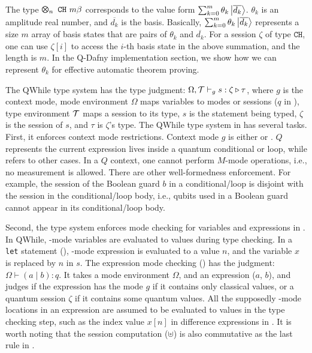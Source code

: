The type $\ttype{n}{\tch{m}{\beta}}$ corresponds to the value form $\sum_{k=0}^{m}\theta_k\left\vert{\overline{d_k}}\right\rangle$.
$\theta_k$ is an amplitude real number, and $\overline{d_k}$ is the basis.
Basically, $\sum_{k=0}^{m}\theta_k\left\vert{\overline{d_k}}\right\rangle$ represents a size $m$ array of basis states
that are pairs of $\theta_k$ and $\overline{d_k}$. For a session $\zeta$ of type $\texttt{CH}$,
one can use $\zeta[i]$ to access the $i$-th basis state in the above summation, and the length is $m$.
In the Q-Dafny implementation section, we show how we can represent $\theta_k$ for effective automatic theorem proving.

The QWhile type system has the type judgment: $\Omega,\mathcal{T}\vdash_g s : \zeta\triangleright \tau$, where $g$ is the context mode, mode environment $\Omega$ maps variables to modes or sessions ($q$ in ), type environment $\mathcal{T}$ maps a session to its type, $s$ is the statement being typed, $\zeta$ is the session of $s$, and $\tau$ is $\zeta$'s type. 
The QWhile type system in  has several tasks. First, it enforces context mode restrictions.
Context mode $g$ is either \cmode or \qmode.
$Q$ represents the current expression lives inside a quantum conditional or loop, while \cmode refers to other cases.
In a $Q$ context, one cannot perform $M$-mode operations, i.e., no measurement is allowed.
There are other well-formedness enforcement. For example,
the session of the Boolean guard $b$ in a conditional/loop is disjoint with the session in the conditional/loop body,
i.e., qubits used in a Boolean guard cannot appear in its conditional/loop body.

Second, the type system enforces mode checking for variables and expressions in .
In QWhile, \cmode-mode variables are evaluated to values during type checking.
In a \texttt{let} statement (),
\cmode-mode expression is evaluated to a value $n$, and the variable $x$ is replaced by $n$ in $s$.
The expression mode checking () has the judgment: $\Omega \vdash (a\mid b) : q$. It takes a mode environment $\Omega$, and an expression ($a$, $b$), and judges if the expression has the mode $g$ if it contains only classical values, or a quantum session $\zeta$ if it contains some quantum values. 
All the supposedly \cmode-mode locations in an expression are assumed
to be evaluated to values in the type checking step,
such as the index value $x[n]$ in difference expressions in .
It is worth noting that the session computation ($\uplus$)
is also commutative as the last rule in .

